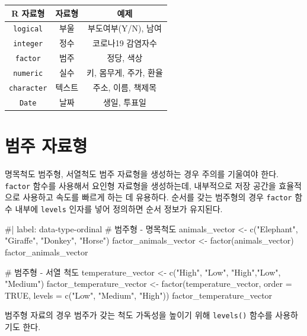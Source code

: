 \documentclass[
  letterpaper,
]{book}
\newenvironment{Shaded}{\begin{snugshade}}{\end{snugshade}}
\newcommand{\NormalTok}[1]{\textcolor[rgb]{0.00,0.23,0.31}{#1}}
\begin{document}
\begin{longtable}[]{@{}ccc@{}}
\toprule\noalign{}
R 자료형 & 자료형 & 예제 \\
\midrule\noalign{}
\endhead
\bottomrule\noalign{}
\endlastfoot
\texttt{logical} & 부울 & 부도여부(Y/N), 남여 \\
\texttt{integer} & 정수 & 코로나19 감염자수 \\
\texttt{factor} & 범주 & 정당, 색상 \\
\texttt{numeric} & 실수 & 키, 몸무게, 주가, 환율 \\
\texttt{character} & 텍스트 & 주소, 이름, 책제목 \\
\texttt{Date} & 날짜 & 생일, 투표일 \\
\end{longtable}

  
 

\section{범주 자료형}\label{data-type-factor}

명목척도 범주형, 서열척도 범주 자료형을 생성하는 경우 주의를 기울여야
한다. \texttt{factor} 함수를 사용해서 요인형 자료형을 생성하는데,
내부적으로 저장 공간을 효율적으로 사용하고 속도를 빠르게 하는 데
유용하다. 순서를 갖는 범주형의 경우 \texttt{factor} 함수 내부에
\texttt{levels} 인자를 넣어 정의하면 순서 정보가 유지된다.

\begin{Shaded}
\begin{Highlighting}[]
\NormalTok{\#| label: data{-}type{-}ordinal}
\NormalTok{\# 범주형 {-} 명목척도}
\NormalTok{animals\_vector \textless{}{-} c("Elephant", "Giraffe", "Donkey", "Horse")}
\NormalTok{factor\_animals\_vector \textless{}{-} factor(animals\_vector)}
\NormalTok{factor\_animals\_vector}

\NormalTok{\# 범주형 {-} 서열 척도}
\NormalTok{temperature\_vector \textless{}{-} c("High", "Low", "High","Low", "Medium")}
\NormalTok{factor\_temperature\_vector \textless{}{-} factor(temperature\_vector, order = TRUE, levels = c("Low", "Medium", "High"))}
\NormalTok{factor\_temperature\_vector}
\end{Highlighting}
\end{Shaded}

범주형 자료의 경우 범주가 갖는 척도 가독성을 높이기 위해
\texttt{levels()} 함수를 사용하기도 한다.
\end{document}
